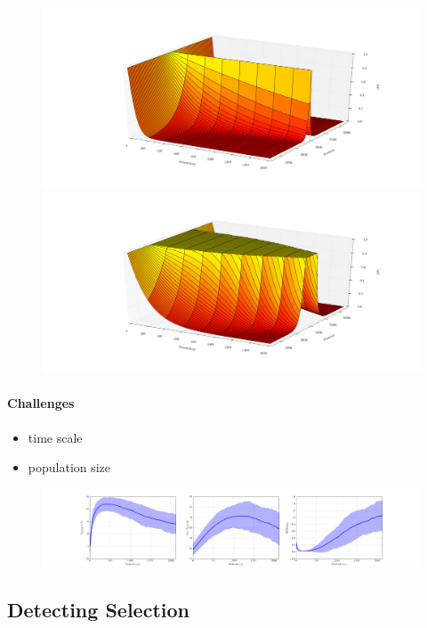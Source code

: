 \documentclass[11pt]{article}
\begin{document}
\begin{figure}
	\centering
	\includegraphics[width=\textwidth]{LDDecay3dNeutral}
	\includegraphics[width=\textwidth]{LDDecay3dSweep}
\end{figure}


\paragraph{Challenges}
\begin{itemize}
	\item time scale
	\item population size
\end{itemize}
\begin{figure}
	\centering \label{fig:bottleneck}
	\includegraphics[trim=3.2in 0.1in 3.2in 0.2in , 
	clip,width=\textwidth]{bottleneck}
\end{figure}



\subsection{Detecting Selection}
\end{document}
